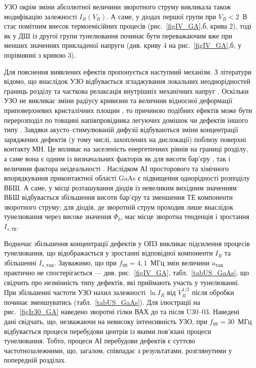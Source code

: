 УЗО окрім зміни абсолютної величини зворотного струму викликала також модифікацію залежності $I_R(V_R)$.
А саме, у діодах першої групи при $V_R<2$~В стає помітним внесок термоемісійних процесів (рис.~\ref{figIV_GA},б, крива 2),
тоді як у ДШ із другої групи тунелювання починає бути переважаючим вже при менших значеннях прикладеної напруги (див. криву 4 на рис.~\ref{figIV_GA},б, у порівнянні з кривою 3).

Для пояснення виявлених ефектів пропонується наступний механізм.
З літератури  відомо, що внаслідок УЗО відбувається згладжування локальних неоднорідностей границь розділу \cite{Parchinskii2003r} та
часткова релаксація внутрішніх механічних напруг \cite{BritunFTT,Zdeb1989}.
Оскільки УЗО не викликає зміни  радіусу кривизни та величини відносної деформації приповерхневих кристалічних площин \cite{UST:SDErmol},
то причиною подібних ефектів може бути перерозподіл по товщині напівпровідника легуючих домішок \cite{Zaver} чи дефектів іншого типу \cite{Ostrov2002FTPr}.
Завдяки акусто--стимулюваній дифузії відбуваються зміни концентрації заряджених дефектів (у тому числі, захоплених на дислокації) поблизу поверхні контакту МН.
  Це впливає на заселеність енергетичних рівнів на границі розділу, а саме вона є одним із визначальних факторів як для висоти бар’єру \cite{Rhoderick1988,Singh1994},
так і величини фактора неідеальності \cite{Ikoma}.
Наслідком АІ просторового та хімічного впорядкування приконтактної області GaAs є підвищення однорідності розподілу ВБШ.
А саме, у місці розташування діодів із невеликим вихідним значенням ВБШ відбувається збільшення висоти бар'єру та зменшення ТЕ компоненти зворотного струму;
 для діодів, де зворотній струм проходив лише внаслідок тунелювання через високе значення $\Phi_b$, має місце зворотна тенденція і зростання $I_{s,\mathtt{TE}}$.

Водночас збільшення концентрації дефектів у ОПЗ викликає підсилення процесів тунелювання, що відображається у зростанні відповідної компоненти $I_R$
та збільшенні $I_{s,\mathtt{tun}}$.
Зауважимо, що при $f_\mathtt{US}=4,1$~МГц змін величини $a_\mathtt{tun}$ практично не спостерігається --- див. рис.~\ref{figIV_GA}, табл.~\ref{tabUS_GaAs},
що свідчить про незмінність типу дефектів, які приймають участь у тунелюванні.
При збільшенні частоти УЗО нахил залежності $\ln I_R$ від $V_R^{1/2}$  після обробки починає зменшуватись (табл.~\ref{tabUS_GaAs}).
Для ілюстрації на рис.~\ref{figIr30_GA} наведено зворотні гілки ВАХ до та після U30--03.
Наведені дані свідчать, що, незважаючи на невисоку інтенсивність УЗО, при $f_\mathtt{US}=30$~МГц відбувається процеси перебудови центрів із якими пов'язані процеси тунелювання.
Тобто, процеси АІ перебудови дефектів є суттєво частотнозалежними, що, загалом, співпадає з результатами, розглянутими у попередній розділах.


